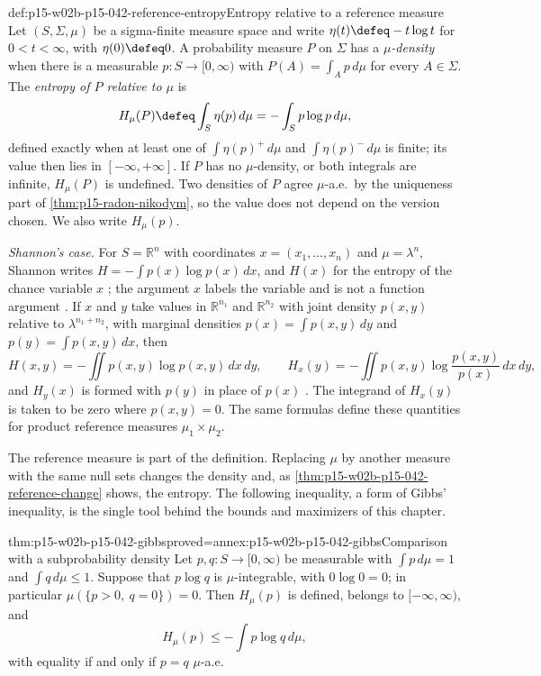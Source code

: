 \begin{hbdefinition}{def:p15-w02b-p15-042-reference-entropy}{Entropy relative to a reference measure}
Let \((S,\Sigma,\mu)\) be a sigma-finite measure space and write
\(\eta(t)\defeq-t\log t\) for \(0<t<\infty\), with \(\eta(0)\defeq0\).
A probability measure \(P\) on \(\Sigma\) has a \emph{\(\mu\)-density}
when there is a measurable \(p:S\to[0,\infty)\) with
\(P(A)=\int_A p\,d\mu\) for every \(A\in\Sigma\).
The \emph{entropy of \(P\) relative to \(\mu\)} is
\[
 H_\mu(P)\defeq\int_S\eta(p)\,d\mu
          =-\int_S p\log p\,d\mu ,
\]
defined exactly when at least one of \(\int\eta(p)^+\,d\mu\) and
\(\int\eta(p)^-\,d\mu\) is finite; its value then lies in
\([-\infty,+\infty]\). If \(P\) has no \(\mu\)-density, or both integrals are
infinite, \(H_\mu(P)\) is undefined. Two densities of \(P\) agree
\(\mu\)-a.e.\ by the uniqueness part of \cref{thm:p15-radon-nikodym}, so the
value does not depend on the version chosen. We also write \(H_\mu(p)\).

\emph{Shannon's case.} For \(S=\mathbb R^n\) with coordinates
\(x=(x_1,\ldots,x_n)\) and \(\mu=\lambda^n\), Shannon writes
\(H=-\int p(x)\log p(x)\,dx\), and \(H(x)\) for the entropy of the chance
variable \(x\) \cite[sec.~20, p.~35]{Shannon1948MathematicalTheory}; the argument
\(x\) labels the variable and is not a function argument
\cite[sec.~6, p.~11]{Shannon1948MathematicalTheory}.
If \(x\) and \(y\) take values in \(\mathbb R^{n_1}\) and \(\mathbb R^{n_2}\)
with joint density \(p(x,y)\) relative to \(\lambda^{n_1+n_2}\), with marginal
densities \(p(x)=\int p(x,y)\,dy\) and \(p(y)=\int p(x,y)\,dx\), then
\[
 H(x,y)=-\iint p(x,y)\log p(x,y)\,dx\,dy,\qquad
 H_x(y)=-\iint p(x,y)\log\frac{p(x,y)}{p(x)}\,dx\,dy,
\]
and \(H_y(x)\) is formed with \(p(y)\) in place of \(p(x)\)
\cite[sec.~20, p.~35]{Shannon1948MathematicalTheory}. The integrand of \(H_x(y)\) is
taken to be zero where \(p(x,y)=0\). The same formulas define these
quantities for product reference measures \(\mu_1\times\mu_2\).
\end{hbdefinition}

The reference measure is part of the definition. Replacing \(\mu\) by another
measure with the same null sets changes the density and, as
\cref{thm:p15-w02b-p15-042-reference-change} shows, the entropy. The
following inequality, a form of Gibbs' inequality, is the single tool behind
the bounds and maximizers of this chapter.

\begin{hblemma}{thm:p15-w02b-p15-042-gibbs}{proved=annex:p15-w02b-p15-042-gibbs}{Comparison with a subprobability density}
Let \(p,q:S\to[0,\infty)\) be measurable with \(\int p\,d\mu=1\) and
\(\int q\,d\mu\leq1\). Suppose that \(p\log q\) is \(\mu\)-integrable, with
\(0\log0=0\); in particular \(\mu(\{p>0,\ q=0\})=0\). Then \(H_\mu(p)\) is
defined, belongs to \([-\infty,\infty)\), and
\[
 H_\mu(p)\leq-\int p\log q\,d\mu ,
\]
with equality if and only if \(p=q\) \(\mu\)-a.e.
\end{hblemma}

